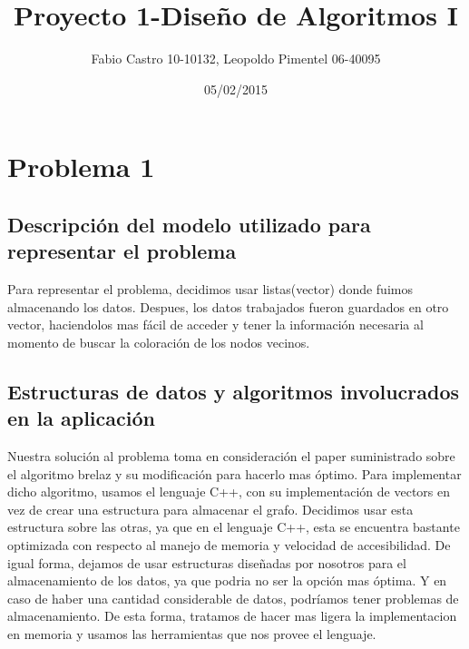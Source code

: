 \documentclass[a4paper,10pt]{article}
\title{}
\author{}
\date{}
\begin{document}
 
\title{\Huge Proyecto 1-Diseño de Algoritmos I}



\author{Fabio Castro 10-10132, Leopoldo Pimentel 06-40095} 



\date{05/02/2015}

\maketitle
\section{Problema 1}
\subsection{Descripción del modelo utilizado para representar el problema}
\hspace{2cm}
Para representar el problema, decidimos usar listas(vector) donde fuimos almacenando los datos. Despues, los datos trabajados fueron guardados en otro vector, haciendolos mas fácil de acceder y tener la información necesaria al momento de buscar la coloración de los nodos vecinos.
\subsection{Estructuras de datos y algoritmos involucrados en la aplicación}
\hspace{2cm}
Nuestra solución al problema toma en consideración el paper suministrado sobre el algoritmo brelaz y su modificación para hacerlo mas óptimo. 
Para implementar dicho algoritmo, usamos el lenguaje C++, con su implementación de vectors en vez de crear una estructura para almacenar el grafo.
Decidimos usar esta estructura sobre las otras, ya que en el lenguaje C++, esta se encuentra bastante optimizada con respecto al manejo de memoria y velocidad de accesibilidad.
De igual forma, dejamos de usar estructuras diseñadas por nosotros para el almacenamiento de los datos, ya que podria no ser la opción mas óptima. Y en caso de haber una cantidad considerable de datos, podríamos tener problemas de almacenamiento.
De esta forma, tratamos de hacer mas ligera la implementacion en memoria y usamos las herramientas que nos provee el lenguaje.
\end{document}
